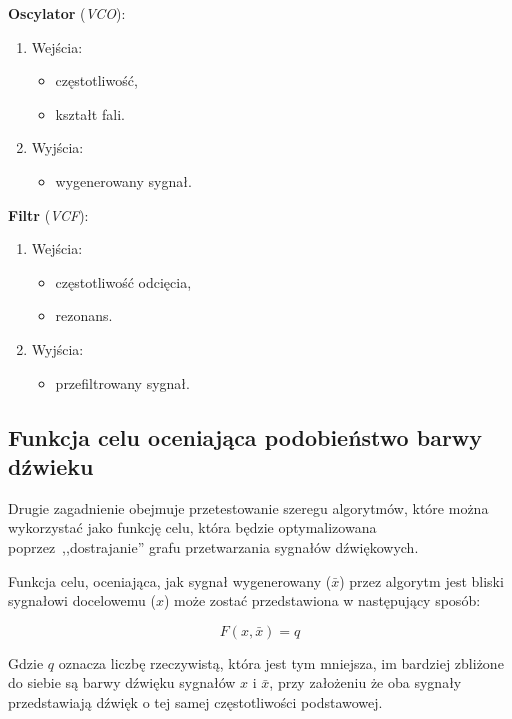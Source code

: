 \begin{multicols}{2}

\noindent
\textbf{Oscylator} (\textit{VCO}):
\begin{enumerate}
  \item Wejścia:
    \begin{itemize}
      \item częstotliwość,
      \item kształt fali.
    \end{itemize}
  \item Wyjścia:
    \begin{itemize}
      \item wygenerowany sygnał.
    \end{itemize}
\end{enumerate}

\noindent
\textbf{Filtr} (\textit{VCF}):
\begin{enumerate}
  \item Wejścia:
    \begin{itemize}
      \item częstotliwość odcięcia,
      \item rezonans.
    \end{itemize}
  \item Wyjścia:
    \begin{itemize}
      \item przefiltrowany sygnał.
    \end{itemize}
\end{enumerate}
\end{multicols}

\subsection{Funkcja celu oceniająca podobieństwo barwy dźwieku}

Drugie zagadnienie obejmuje przetestowanie szeregu algorytmów, które można wykorzystać jako funkcję celu,
która będzie optymalizowana poprzez~,,dostrajanie'' grafu przetwarzania sygnałów dźwiękowych.

Funkcja celu, oceniająca, jak sygnał wygenerowany ($\bar{x}$) przez algorytm jest bliski sygnałowi docelowemu ($x$)
może zostać przedstawiona w następujący sposób:

\begin{equation}
  F(x, \bar{x}) = q
  \label{eq:target_function}
\end{equation}

\noindent
Gdzie $q$ oznacza liczbę rzeczywistą, która jest tym mniejsza, im bardziej zbliżone do siebie są barwy dźwięku sygnałów $x$ i $\bar{x}$,
przy założeniu że oba sygnały przedstawiają dźwięk o tej samej częstotliwości podstawowej.

